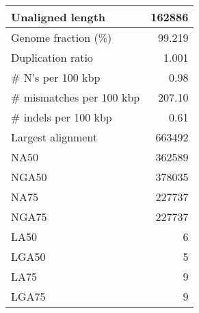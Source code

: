 \documentclass[12pt,a4paper]{article}
\begin{document}
\begin{table}[ht]
\begin{center}
\begin{tabular}{|l*{1}{|r}|}
Unaligned length & 162886 \\ \hline
Genome fraction (\%) & 99.219 \\ \hline
Duplication ratio & 1.001 \\ \hline
\# N's per 100 kbp & 0.98 \\ \hline
\# mismatches per 100 kbp & 207.10 \\ \hline
\# indels per 100 kbp & 0.61 \\ \hline
Largest alignment & 663492 \\ \hline
NA50 & 362589 \\ \hline
NGA50 & 378035 \\ \hline
NA75 & 227737 \\ \hline
NGA75 & 227737 \\ \hline
LA50 & 6 \\ \hline
LGA50 & 5 \\ \hline
LA75 & 9 \\ \hline
LGA75 & 9 \\ \hline
\end{tabular}
\end{center}
\end{table}
\end{document}
